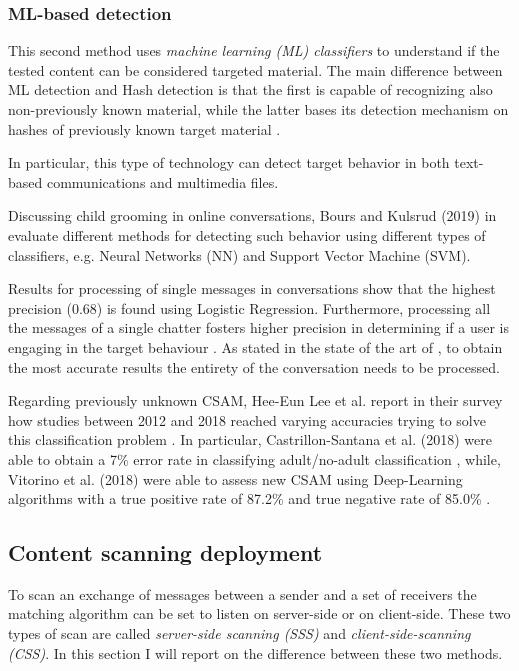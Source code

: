\subsubsection{ML-based detection}
\label{sss:ML}

This second method uses \textit{machine learning (ML) classifiers} to understand if the tested content can be considered targeted material. The main difference between ML detection and Hash detection is that the first is capable of recognizing also non-previously known material, while the latter bases its detection mechanism on hashes of previously known target material \cite{abelson2024bugs}. 

In particular, this type of technology can detect target behavior in both text-based communications and multimedia files.

Discussing child grooming in online conversations, Bours and Kulsrud (2019) in \cite{Bours} evaluate different methods for detecting such behavior using different types of classifiers, e.g. Neural Networks (NN) and Support Vector Machine (SVM). 

Results for processing of single messages in conversations show that the highest precision (0.68) is found using Logistic Regression. Furthermore, processing all the messages of a single chatter fosters higher precision in determining if a user is engaging in the target behaviour \cite {Bours}. As stated in the state of the art of \cite{Bours}, to obtain the most accurate results the entirety of the conversation needs to be processed.

Regarding previously unknown CSAM, Hee-Eun Lee et al. report in their survey how studies between 2012 and 2018 reached varying accuracies trying to solve this classification problem \cite{LEE2020301022}. In particular, Castrillon-Santana et al. (2018) were able to obtain a 7\% error rate in classifying adult/no-adult classification \cite{CASTRILLONSANTANA201810}, while, Vitorino et al. (2018) were able to assess new CSAM using Deep-Learning algorithms with a true positive rate of 87.2\% and true negative rate of 85.0\% \cite{VITORINO2018303}.

\subsection{Content scanning deployment}
\label{ss:scanning}

To scan an exchange of messages between a sender and a set of receivers the matching algorithm can be set to listen on server-side or on client-side. These two types of scan are called \textit{server-side scanning (SSS)} and \textit{client-side-scanning (CSS)}. In this section I will report on the difference between these two methods.

